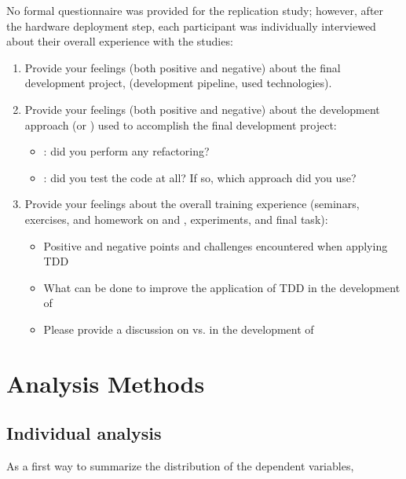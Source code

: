 \noindent No formal questionnaire was provided for the replication study; however, after the hardware deployment step, each participant was individually interviewed about their overall experience with the studies:
\begin{enumerate}
    \item Provide your feelings (both positive and negative) about the final development project, (\eg development pipeline, used technologies).
    \item Provide your feelings (both positive and negative) about the development approach (\ie \tdd or \notdd) used to accomplish the final development project:
        \begin{itemize}
            \item \tdd: did you perform any refactoring? 
            \item \notdd: did you test the code at all? If so, which approach did you use?
        \end{itemize}
    \item Provide your feelings about the overall training experience (seminars, exercises, and homework on \tdd and \notdd, experiments, and final task):
        \begin{itemize}
            \item Positive and negative points and challenges encountered when applying TDD
            \item What can be done to improve the application of TDD in the development of \ess
            \item Please provide a discussion on \tdd vs. \notdd in the development of \ess
        \end{itemize}
\end{enumerate}
 




\section{Analysis Methods}
\subsection{Individual analysis}
As a first way to summarize the distribution of the dependent variables, 

